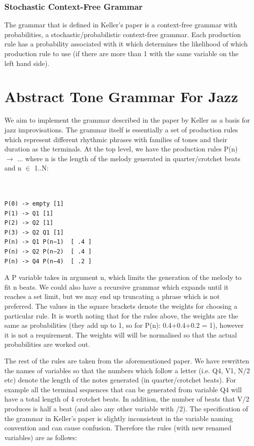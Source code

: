 \documentclass[pdftex,12pt,a4paper]{report}
\begin{document}
\subsubsection{Stochastic Context-Free Grammar}
The grammar that is defined in Keller's paper \cite{keller07} is a context-free grammar with probabilities, a stochastic/probabilistic context-free grammar. Each production rule has a probability associated with it which determines the likelihood of which production rule to use (if there are more than 1 with the same variable on the left hand side).

\section{Abstract Tone Grammar For Jazz}
We aim to implement the grammar described in the paper by Keller \cite{keller07} as a basis for jazz improvisations. The grammar itself is essentially a set of production rules which represent different rhythmic phrases with families of tones and their duration as the terminals. At the top level, we have the production rules P(n) $\rightarrow$ ... where n is the length of the melody generated in quarter/crotchet beats and n $\in$ 1..N:

\begin{verbatim}


P(0) -> empty [1]
P(1) -> Q1 [1] 
P(2) -> Q2 [1] 
P(3) -> Q2 Q1 [1] 
P(n) -> Q1 P(n−1)  [ .4 ]
P(n) -> Q2 P(n−2)  [ .4 ] 
P(n) -> Q4 P(n−4)  [ .2 ]

\end{verbatim}

A P variable takes in argument n, which limits the generation of the melody to fit n beats. We could also have a recursive grammar which expands until it reaches a set limit, but we may end up truncating a phrase which is not preferred. The values in the square brackets denote the weights for choosing a particular rule. It is worth noting that for the rules above, the weights are the same as probabilities (they add up to 1, so for P(n):  0.4+0.4+0.2 = 1), however it is not a requirement. The weights will will be normalised so that the actual probabilities are worked out.

The rest of the rules are taken from the aforementioned paper. We have rewritten the names of variables so that the numbers which follow a letter (i.e. Q4, V1, N/2 etc) denote the length of the notes generated (in quarter/crotchet beats). For example all the terminal sequences that can be generated from variable Q4 will have a total length of 4 crotchet beats. In addition, the number of beats that V/2 produces is half a beat (and also any other variable with /2). The specification of the grammar in Keller's paper \cite{keller07} is slightly inconsistent in the variable naming convention and can cause confusion. Therefore the rules (with new renamed variables) are as follows:
\end{document}
